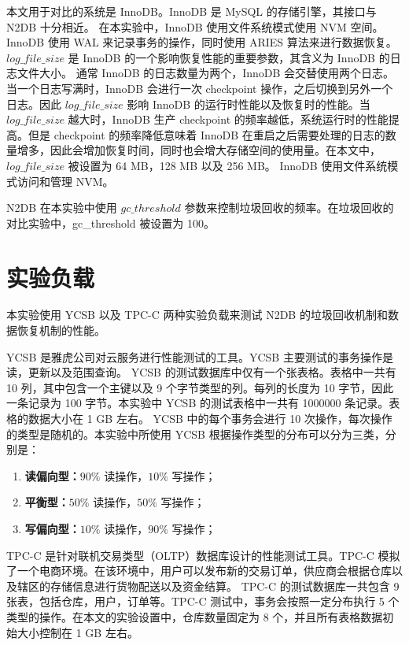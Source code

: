 本文用于对比的系统是 InnoDB。InnoDB 是 MySQL 的存储引擎，其接口与 N2DB 十分相近。
在本实验中，InnoDB 使用文件系统模式使用 NVM 空间。
InnoDB 使用 WAL 来记录事务的操作，同时使用 ARIES 算法来进行数据恢复。
$log\_file\_size$ 是 InnoDB 的一个影响恢复性能的重要参数，其含义为 InnoDB 的日志文件大小。
通常 InnoDB 的日志数量为两个，InnoDB 会交替使用两个日志。当一个日志写满时，InnoDB 会进行一次 checkpoint 操作，之后切换到另外一个日志。因此 $log\_file\_size$ 影响 InnoDB 的运行时性能以及恢复时的性能。当 $log\_file\_size$ 越大时，InnoDB 生产 checkpoint 的频率越低，系统运行时的性能提高。但是 checkpoint 的频率降低意味着 InnoDB 在重启之后需要处理的日志的数量增多，因此会增加恢复时间，同时也会增大存储空间的使用量。在本文中，$log\_file\_size$ 被设置为 64 MB，128 MB 以及 256 MB。
InnoDB 使用文件系统模式访问和管理 NVM。

N2DB 在本实验中使用 $gc\_threshold$ 参数来控制垃圾回收的频率。在垃圾回收的对比实验中，gc\_threshold 被设置为 100。

\section{实验负载}

本实验使用 YCSB 以及 TPC-C 两种实验负载来测试 N2DB 的垃圾回收机制和数据恢复机制的性能。

YCSB 是雅虎公司对云服务进行性能测试的工具。YCSB 主要测试的事务操作是读，更新以及范围查询。
YCSB 的测试数据库中仅有一个张表格。表格中一共有 10 列，其中包含一个主键以及 9 个字节类型的列。每列的长度为 10 字节，因此一条记录为 100 字节。本实验中 YCSB 的测试表格中一共有 1000000 条记录。表格的数据大小在 1 GB 左右。
YCSB 中的每个事务会进行 10 次操作，每次操作的类型是随机的。本实验中所使用 YCSB 根据操作类型的分布可以分为三类，分别是：
\begin{enumerate}
    \item \textbf{读偏向型：}$90\%$ 读操作，$10\%$ 写操作；
    \item \textbf{平衡型：}$50\%$ 读操作，$50\%$ 写操作；
    \item \textbf{写偏向型：}$10\%$ 读操作，$90\%$ 写操作；
\end{enumerate}


TPC-C 是针对联机交易类型（OLTP）数据库设计的性能测试工具。TPC-C 模拟了一个电商环境。在该环境中，用户可以发布新的交易订单，供应商会根据仓库以及辖区的存储信息进行货物配送以及资金结算。
TPC-C 的测试数据库一共包含 9 张表，包括仓库，用户，订单等。TPC-C 测试中，事务会按照一定分布执行 5 个类型的操作。在本文的实验设置中，仓库数量固定为 8 个，并且所有表格数据初始大小控制在 1 GB 左右。

